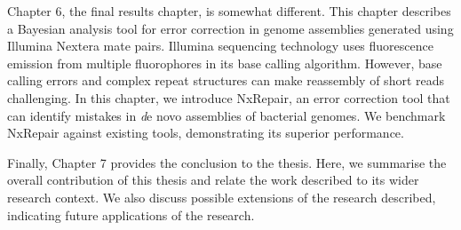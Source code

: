 Chapter 6, the final results chapter, is somewhat different. This chapter describes a Bayesian analysis tool for error correction in genome assemblies generated using Illumina Nextera mate pairs. Illumina sequencing technology uses fluorescence emission from multiple fluorophores in its base calling algorithm. However, base calling errors and complex repeat structures can make reassembly of short reads challenging. In this chapter, we introduce NxRepair, an error correction tool that can identify mistakes in {\emph de novo} assemblies of bacterial genomes. We benchmark NxRepair against existing tools, demonstrating its superior performance.

Finally, Chapter 7 provides the conclusion to the thesis. Here, we summarise the overall contribution of this thesis and relate the work described to its wider research context. We also discuss possible extensions of the research described, indicating future applications of the research.